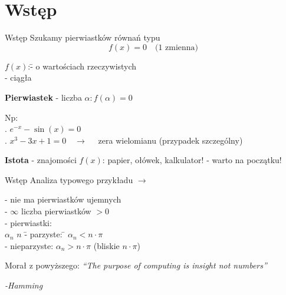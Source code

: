 \section{Wstęp}
\begin{frame}{Wstęp}
    Szukamy pierwiastków równań typu
    \[
    f(x) = 0 \quad \textrm{(1 zmienna)}
    \]
    \begin{tabbing}
	    $f(x)$:\quad \= - o wartościach rzeczywistych\\
	    \> - ciągła
    \end{tabbing}
	{\bf Pierwiastek} - liczba $\alpha : f(\alpha) = 0$
	\begin{tabbing}
		Np:\\
		. $e^{-x} - \sin(x) = 0$\\
		. $x^{3} - 3x + 1 = 0 \quad\rightarrow\quad$ zera wielomianu (przypadek szczególny)
	\end{tabbing}
	{\bf Istota} - znajomości $f(x)$: papier, ołówek, kalkulator! - warto na początku!
\end{frame}
\begin{frame}{Wstęp}
	Analiza typowego przykładu $\rightarrow$\linebreak
	\begin{tabbing}
		- nie ma pierwiastków ujemnych\\
		- $\infty$ liczba pierwiastków $> 0$\\
		- pierwiastki:\\
		\quad $\alpha_{n}$ \quad $n$ \=- parzyste: \qquad\= $\alpha_{n} < n \cdot \pi$\\
		\>- nieparzyste: \>$\alpha_{n} > n \cdot \pi$ \qquad (bliskie $n \cdot \pi$)
	\end{tabbing}
	\begin{block}{Morał z powyższego:}
		{\it ``The purpose of computing is insight not numbers''}
		\begin{flushright}
			{\it -Hamming}
		\end{flushright}
	\end{block}
\end{frame}
